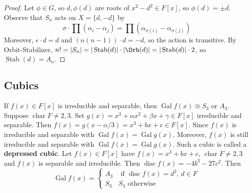\documentclass[11pt, a4paper]{memoir}
\newcommand{\mbf}[1]{{\boldmath\bfseries #1}}
\theoremstyle{change}
\theoremstyle{plain}
\theoremstyle{nonumberplain}
\newtheorem{proof}{Proof}
\DeclareMathOperator{\chr}{char}
\DeclareMathOperator{\disc}{disc}
\DeclareMathOperator{\Gal}{Gal}
\DeclareMathOperator{\Stab}{Stab}
\numberwithin{equation}{section}
\begin{document}
\begin{proof}
    Let $\phi\in G$, so $d,\phi(d)$ are roots of $x^2-d^2\in F[x]$, so $\phi(d)=\pm d$.
    Observe that $S_n$ acts on $X=\{d,-d\}$ by
    \begin{equation*}
        \sigma\cdot\prod(\alpha_i-\alpha_j)=\prod(\alpha_{\sigma(i)}-\alpha_{\sigma(j)})
    \end{equation*}
    Moreover, $\epsilon\cdot d=d$ and $(n(n-1))\cdot d=-d$, so the action is transitive.
    By Orbit-Stabilizer, $n!=|S_n|=|\Stab(d)|\cdot|\Orb(d)|=|\Stab(d)|\cdot 2$, so $\Stab(d)=A_n$.
\end{proof}
\subsection{Cubics}
If $f(x)\in F[x]$ is irreducible and separable, then $\Gal f(x)\cong S_3$ or $A_3$.
Suppose $\chr F\neq 2,3$.
Set $g(x)=x^3+\alpha x^2+\beta x+\gamma\in F[x]$ irreducible and separable.
Then $f(x)=g(x-\alpha/3)=x^3+bx+c\in F[x]$.
Since $f(x)$ is irreducible and separable with $\Gal f(x)=\Gal g(x)$.
Moreover, $f(x)$ is still irreducible and separable with $\Gal f(x)=\Gal g(x)$.
Such a cubic is called a \mbf{depressed cubic}.
Let $f(x)\in F[x]$ have $f(x)=x^3+bx+c$, $\chr F\neq 2,3$ and $f(x)$ is separable and irreducible.
Then $\disc f(x)=-4b^3-27c^2$.
Then
\begin{equation*}
    \Gal f(x)=
    \begin{cases}
        A_3&\text{ if $\disc f(x)=d^2$, $d\in F$}\\
        S_3&\text{$S_3$ otherwise}
    \end{cases}
\end{equation*}
\end{document}
